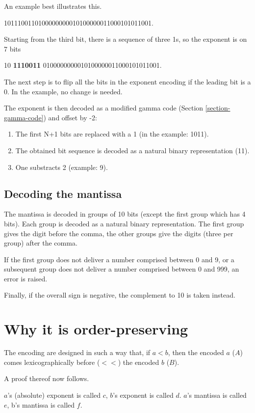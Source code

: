 \documentclass{acm_proc_article-sp}
\begin{document}
An example best illustrates this.

1011100110100000000010100000011000101011001.

Starting from the third bit, there is a sequence of three 1s, so the exponent is on 7 bits

10 \textbf{1110011} 0100000000010100000011000101011001.

The next step is to flip all the bits in the exponent encoding if the leading bit is a 0. In the example, no change is needed.

The exponent is then decoded as a modified gamma code (Section \ref{section-gamma-code}) and offset by -2:

\begin{enumerate}
\item The first N+1 bits are replaced with a 1 (in the example: 1011).
\item The obtained bit sequence is decoded as a natural binary representation (11).
\item One substracts 2 (example: 9).
\end{enumerate}

\subsection{Decoding the mantissa}

The mantissa is decoded in groups of 10 bits (except the first group which has 4 bits). Each group is decoded as a natural binary representation. The first group gives the digit before the comma, the other groups give the digits (three per group) after the comma.

If the first group does not deliver a number comprised between 0 and 9, or a subsequent group does not deliver a number comprised between 0 and 999, an error is raised.

Finally, if the overall sign is negative, the complement to 10 is taken instead.

\section{Why it is order-preserving}

The encoding are designed in such a way that, if $a < b$, then the encoded $a$ ($A$) comes lexicographically before ($<<$) the encoded $b$ ($B$).

A proof thereof now follows.

$a$'s (absolute) exponent is called $c$, $b$'s exponent is called $d$. $a$'s mantissa is called $e$, b's mantissa is called $f$.
 
\end{document}
